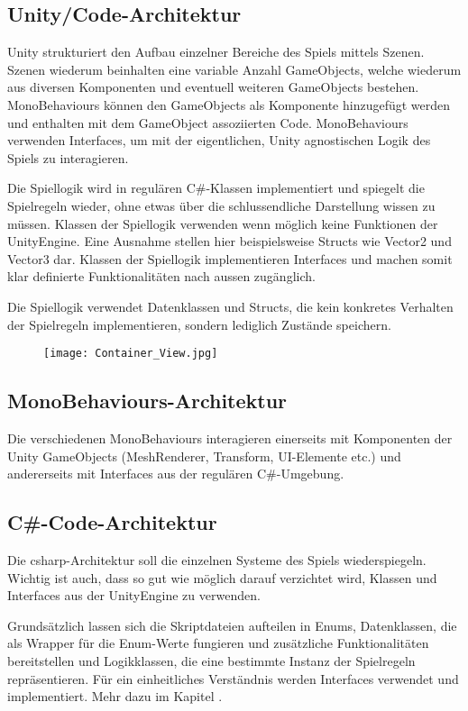 \documentclass[../main.tex]{subfiles}
\begin{document}
	\subsection{Unity/Code-Architektur}
	\label{section:UnityCodeArchitektur}
	\par Unity strukturiert den Aufbau einzelner Bereiche des Spiels mittels Szenen. Szenen wiederum beinhalten eine variable Anzahl GameObjects, welche wiederum aus diversen Komponenten und eventuell weiteren GameObjects bestehen. MonoBehaviours können den GameObjects als Komponente hinzugefügt werden und enthalten mit dem GameObject assoziierten Code. MonoBehaviours verwenden Interfaces, um mit der eigentlichen, Unity agnostischen Logik des Spiels zu interagieren.
	\par Die Spiellogik wird in regulären C\#-Klassen implementiert und spiegelt die Spielregeln wieder, ohne etwas über die schlussendliche Darstellung wissen zu müssen. Klassen der Spiellogik verwenden wenn möglich keine Funktionen der UnityEngine. Eine Ausnahme stellen hier beispielsweise Structs wie Vector2 und Vector3 dar. Klassen der Spiellogik implementieren Interfaces und machen somit klar definierte Funktionalitäten nach aussen zugänglich.
	\par Die Spiellogik verwendet Datenklassen und Structs, die kein konkretes Verhalten der Spielregeln implementieren, sondern lediglich Zustände speichern.
	\begin{figure}[H]
		\centering
		\texttt{[image: Container\_View.jpg]}
	\end{figure}
	
	\subsection{MonoBehaviours-Architektur}
	\par Die verschiedenen MonoBehaviours interagieren einerseits mit Komponenten der Unity GameObjects (MeshRenderer, Transform, UI-Elemente etc.) und andererseits mit Interfaces aus der regulären C\#-Umgebung.
	\subsection{C\#-Code-Architektur}
	\par Die \gls{csharp}-Architektur soll die einzelnen Systeme des Spiels wiederspiegeln. Wichtig ist auch, dass so gut wie möglich darauf verzichtet wird, Klassen und Interfaces aus der UnityEngine zu verwenden.
	\par Grundsätzlich lassen sich die Skriptdateien aufteilen in Enums, Datenklassen, die als Wrapper für die Enum-Werte fungieren und zusätzliche Funktionalitäten bereitstellen und Logikklassen, die eine bestimmte Instanz der Spielregeln repräsentieren. Für ein einheitliches Verständnis werden Interfaces verwendet und implementiert. Mehr dazu im Kapitel .
\end{document}
